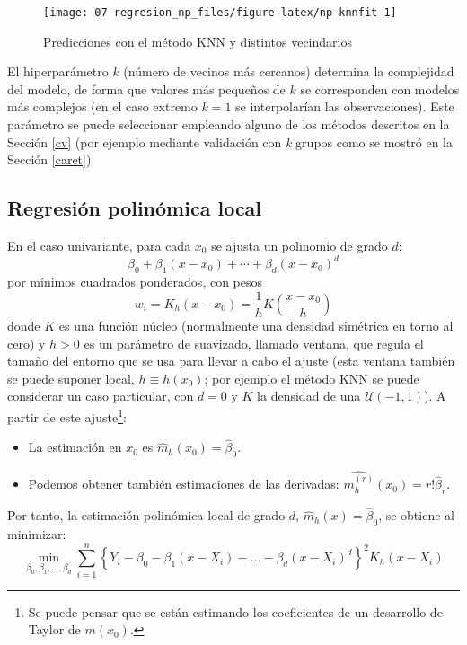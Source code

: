 \documentclass[
]{book}
\theoremstyle{break}
\theoremstyle{definition}
\theoremstyle{definition}
\theoremstyle{definition}
\theoremstyle{definition}
\theoremstyle{remark}
\begin{document}
\begin{figure}[!htb]

{\centering \texttt{[image: 07-regresion\_np\_files/figure-latex/np-knnfit-1]} 

}

\caption{Predicciones con el método KNN y distintos vecindarios}\label{fig:np-knnfit}
\end{figure}

El hiperparámetro \(k\) (número de vecinos más cercanos) determina la complejidad del modelo, de forma que valores más pequeños de \(k\) se corresponden con modelos más complejos (en el caso extremo \(k = 1\) se interpolarían las observaciones).
Este parámetro se puede seleccionar empleando alguno de los métodos descritos en la Sección \ref{cv} (por ejemplo mediante validación con \emph{k} grupos como se mostró en la Sección \ref{caret}).

\hypertarget{reg-locpol}{%
\subsection{Regresión polinómica local}\label{reg-locpol}}

En el caso univariante, para cada \(x_0\) se ajusta un polinomio de grado \(d\):
\[\beta_0+\beta_{1}\left(x - x_0\right) + \cdots 
+ \beta_{d}\left( x-x_0\right)^{d}\]
por mínimos cuadrados ponderados, con pesos
\[w_{i} = K_h(x - x_0) = \frac{1}{h}K\left(\frac{x-x_0}{h}\right)\]
donde \(K\) es una función núcleo (normalmente una densidad simétrica en torno al cero) y \(h>0\) es un parámetro de suavizado, llamado ventana, que regula el tamaño del entorno que se usa para llevar a cabo el ajuste
(esta ventana también se puede suponer local, \(h \equiv h(x_0)\); por ejemplo el método KNN se puede considerar un caso particular, con \(d=0\) y \(K\) la densidad de una \(\mathcal{U}(-1, 1)\)).
A partir de este ajuste\footnote{Se puede pensar que se están estimando los coeficientes de un desarrollo de Taylor de \(m(x_0)\).}:

\begin{itemize}
\item
  La estimación en \(x_0\) es \(\hat{m}_{h}(x_0)=\hat{\beta}_0\).
\item
  Podemos obtener también estimaciones de las derivadas:
  \(\widehat{m_{h}^{(r)}}(x_0) = r!\hat{\beta}_{r}\).
\end{itemize}

Por tanto, la estimación polinómica local de grado \(d\), \(\hat{m}_{h}(x)=\hat{\beta}_0\), se obtiene al minimizar:
\[\min_{\beta_0 ,\beta_1, \ldots, \beta_d} \sum_{i=1}^{n}\left\{ Y_{i} - \beta_0 
- \beta_1(x - X_i) - \ldots -\beta_d(x - X_i)^d \right\}^{2} K_{h}(x - X_i)\]
\end{document}
